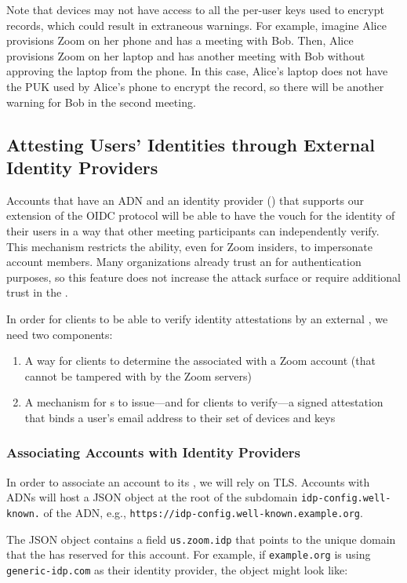 Note that devices may not have access to all the per-user keys used to encrypt records, which could
result in extraneous warnings. For example, imagine Alice provisions Zoom on her phone and has a
meeting with Bob. Then, Alice provisions Zoom on her laptop and has another meeting with Bob without
approving the laptop from the phone. In this case, Alice's laptop does not have the PUK used by
Alice's phone to encrypt the record, so there will be another warning for Bob in the second meeting.

\subsection{Attesting Users' Identities through External Identity Providers}

Accounts that have an ADN and an identity provider (\idp) that supports our extension of the OIDC
protocol will be able to have the \idp vouch for the identity of their users in a way that other
meeting participants can independently verify. This mechanism restricts the ability, even for Zoom
insiders, to impersonate account members. Many organizations already trust an \idp for
authentication purposes, so this feature does not increase the attack surface or require additional
trust in the \idp.

In order for clients to be able to verify identity attestations by an external \idp, we need two
components:

\begin{enumerate}
\item A way for clients to determine the \idp associated with a Zoom account (that cannot be
    tampered with by the Zoom servers)
\item A mechanism for {\idp}s to issue---and for clients to verify---a signed attestation that binds
    a user's email address to their set of devices and keys
\end{enumerate}

\subsubsection{Associating Accounts with Identity Providers}
\label{subsec:adnToIdp}
In order to associate an account to its \idp, we will rely on TLS\@. Accounts with ADNs will
host a JSON object at the root of the subdomain \texttt{idp-config.well-known.} of
the ADN, e.g., \texttt{https://idp-config.well-known.example.org}.

The JSON object contains a field \texttt{us.zoom.idp}
that points to the unique domain that the \idp has reserved for this account. For example, if
\texttt{example.org} is using \texttt{generic-idp.com} as their identity provider, the object might look
like:

